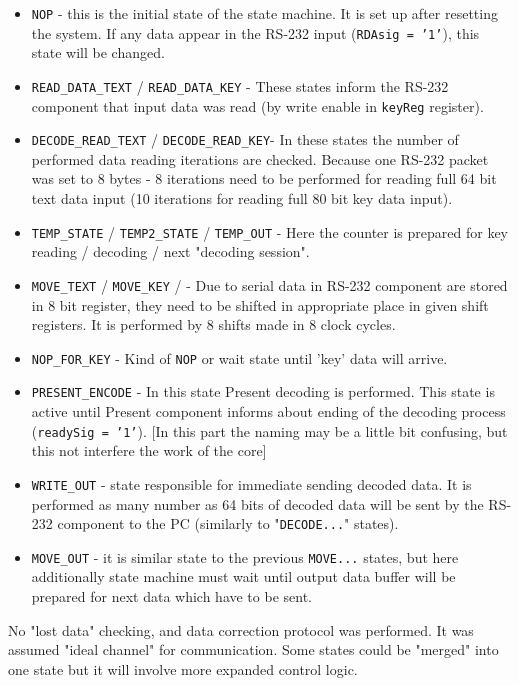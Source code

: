 \documentclass{gajewski}
\begin{document}
\begin{itemize}
    \item \texttt{NOP} - this is the initial state of the state machine. It is set up after resetting the system. If any data appear in the RS-232 input (\texttt{RDAsig = '1'}), this state will be changed.
    \item \texttt{READ\_DATA\_TEXT} / \texttt{READ\_DATA\_KEY} - These states inform the RS-232 component that input data was read (by write enable in \texttt{keyReg} register). 
    \item \texttt{DECODE\_READ\_TEXT} / \texttt{DECODE\_READ\_KEY}- In these states the number of performed data reading iterations are checked. Because one RS-232 packet was set to 8 bytes - 8 iterations need to be performed for reading full 64 bit text data input (10 iterations for reading full 80 bit key data input).
    \item \texttt{TEMP\_STATE} / \texttt{TEMP2\_STATE} / \texttt{TEMP\_OUT} - Here the counter is prepared for key reading / decoding / next "decoding session".
    \item \texttt{MOVE\_TEXT} / \texttt{MOVE\_KEY} / - Due to serial data in RS-232 component are stored in 8 bit register, they need to be shifted in appropriate place in given shift registers. It is performed by 8 shifts made in 8 clock cycles.
    \item \texttt{NOP\_FOR\_KEY} - Kind of \texttt{NOP} or wait state until 'key' data will arrive.
    \item \texttt{PRESENT\_ENCODE} - In this state Present decoding is performed. This state is active until Present component informs about ending of the decoding process (\texttt{readySig = '1'}). [In this part the naming may be a little bit confusing, but this not interfere the work of the core]
    \item \texttt{WRITE\_OUT} - state responsible for immediate sending decoded data. It is performed as many number as 64 bits of decoded data will be sent by the RS-232 component to the PC (similarly to "\texttt{DECODE...}" states). 
    \item \texttt{MOVE\_OUT} - it is similar state to the previous \texttt{MOVE...} states, but here additionally state machine must wait until output data buffer will be prepared for next data which have to be sent.
\end{itemize}
No "lost data" checking, and data correction protocol was performed. It was assumed "ideal channel" for communication. Some states could be "merged" into one state but it will involve more expanded control logic.
\end{document}

